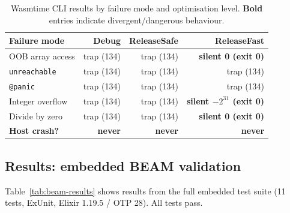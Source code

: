 \documentclass[11pt,a4paper]{article}
\begin{document}
\begin{table}[h]
\centering
\begin{tabular}{lrrr}
\toprule
\textbf{Failure mode} & \textbf{Debug} & \textbf{ReleaseSafe} & \textbf{ReleaseFast} \\
\midrule
OOB array access    & trap (134) & trap (134) & \textbf{silent 0 (exit 0)} \\
\texttt{unreachable}& trap (134) & trap (134) & trap (134) \\
\texttt{@panic}     & trap (134) & trap (134) & trap (134) \\
Integer overflow    & trap (134) & trap (134) & \textbf{silent $-2^{31}$ (exit 0)} \\
Divide by zero      & trap (134) & trap (134) & \textbf{silent 0 (exit 0)} \\
\textbf{Host crash?}& \textbf{never} & \textbf{never} & \textbf{never} \\
\bottomrule
\end{tabular}
\caption{Wasmtime CLI results by failure mode and optimisation level.
         \textbf{Bold} entries indicate divergent/dangerous behaviour.}
\label{tab:cli-results}
\end{table}

\subsection{Results: embedded BEAM validation}

Table~\ref{tab:beam-results} shows results from the full embedded test suite
(11 tests, ExUnit, Elixir 1.19.5 / OTP 28). All tests pass.
\end{document}
